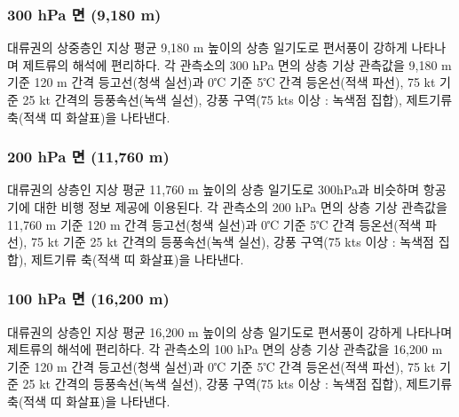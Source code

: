 \subsubsection{300 hPa 면 (9,180 m)}
대류권의 상중층인 지상 평균 9,180 m 높이의 상층 일기도로 편서풍이 강하게 나타나며 제트류의 해석에 편리하다. 각 관측소의 300 hPa 면의 상층 기상 관측값을 9,180 m 기준 120 m 간격 등고선(청색 실선)과 0℃ 기준 5℃ 간격 등온선(적색 파선), 75 kt 기준 25 kt 간격의 등풍속선(녹색 실선), 강풍 구역(75 kts 이상 :  녹색점 집합), 제트기류 축(적색 띠 화살표)을 나타낸다. 

\subsubsection{200 hPa 면 (11,760 m)}
대류권의 상층인 지상 평균 11,760 m 높이의 상층 일기도로 300hPa과 비슷하며 항공기에 대한 비행 정보 제공에 이용된다. 각 관측소의 200 hPa 면의 상층 기상 관측값을 11,760 m 기준 120 m 간격 등고선(청색 실선)과 0℃ 기준 5℃ 간격 등온선(적색 파선), 75 kt 기준 25 kt 간격의 등풍속선(녹색 실선), 강풍 구역(75 kts 이상 :  녹색점 집합), 제트기류 축(적색 띠 화살표)을 나타낸다. 

\subsubsection{100 hPa 면 (16,200 m)}
대류권의 상층인 지상 평균 16,200 m 높이의 상층 일기도로 편서풍이 강하게 나타나며 제트류의 해석에 편리하다. 각 관측소의 100 hPa 면의 상층 기상 관측값을 16,200 m 기준 120 m 간격 등고선(청색 실선)과 0℃ 기준 5℃ 간격 등온선(적색 파선), 75 kt 기준 25 kt 간격의 등풍속선(녹색 실선), 강풍 구역(75 kts 이상 :  녹색점 집합), 제트기류 축(적색 띠 화살표)을 나타낸다. 

